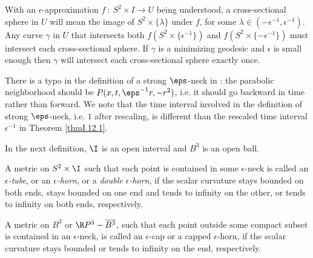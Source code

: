 With an $\epsilon$-approximation
$f \: : \: S^2 \times I \rightarrow U$
being understood, a cross-sectional sphere in $U$ will mean the
image of $S^2 \times \{ \lambda \}$ under $f$, for some
$\lambda \in (- \epsilon^{-1}, \epsilon^{-1})$.
Any curve $\gamma$ in $U$ that intersects both
$f(S^2 \times \{ \epsilon^{-1} \})$ and  $f(S^2 \times \{ -\epsilon^{-1} \})$ must
intersect each cross-sectional
sphere. If $\gamma$ is a minimizing  geodesic and $\epsilon$ is small
enough then $\gamma$ will intersect each cross-sectional sphere
exactly once.

There is a typo in the definition of a strong $\eps$-neck in \cite{Perelman2} :
the parabolic neighborhood should be $P(x,t,\eps^{-1}r,-r^2)$,
i.e. it should go backward in time rather than forward. We note that the
time interval involved in the
definition of strong $\eps$-neck, i.e. $1$ after rescaling, is different than the
rescaled time interval $\epsilon^{-1}$ in Theorem \ref{thmI.12.1}.

In the next definition, $\I$ is an open interval and  $B^3$ is an open ball.

\begin{definition}
  \label{def:kl-notation-terminology-epsilon-tubes-horns-caps}

A metric on
$S^2 \times \I$ such that each point is contained in some $\epsilon$-neck
is called an {\em $\epsilon$-tube}, or an {\em $\epsilon$-horn}, or a {\em double
$\epsilon$-horn}, if the scalar curvature stays bounded on both ends,
stays bounded on one end and tends to infinity on the other, or
tends to infinity on both ends, respectively.

A metric on $B^3$ or $\R P^3 - \overline{B^3}$, such that each point
outside some compact subset is contained in an $\epsilon$-neck, is
called an $\epsilon$-cap or a capped $\epsilon$-horn, if the
scalar curvature stays bounded or tends to infinity on the end,
respectively.
\end{definition}


